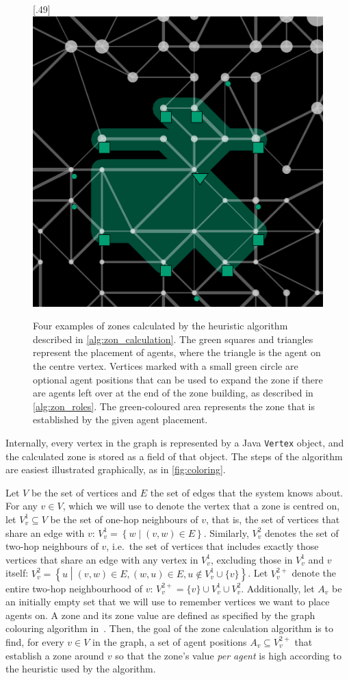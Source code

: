 \begin{figure}
  [.49\linewidth]{\includegraphics[width=.49\linewidth]{images/zone4.png}}
           \caption{Four examples of zones calculated by the heuristic algorithm described in \autoref{alg:zon_calculation}.
           The green squares and triangles represent the placement of agents, where the triangle is the agent on the centre vertex.
           Vertices marked with a small green circle are optional agent positions that can be used to expand the zone if there are agents left over at the end of the zone building, as described in \autoref{alg:zon_roles}.
           The green-coloured area represents the zone that is established by the given agent placement.}
  \label{fig:zones}
\end{figure}
Internally, every vertex in the graph is represented by a Java \lstinline{Vertex} object, and the calculated zone is stored as a field of that object.
The steps of the algorithm are easiest illustrated graphically, as in \autoref{fig:coloring}.
\begin{definition}
  Let $V$ be the set of vertices and $E$ the set of edges that the system knows about.
  For any $v \in V$, which we will use to denote the vertex that a zone is centred on, let $V_v^1 \subseteq V$ be the set of one-hop neighbours of $v$, that is, the set of vertices that share an edge with $v$: $V_v^1= \left\{w \middle|\left(v,w \right ) \in E\right\}$.
  Similarly, $V_v^2$ denotes the set of two-hop neighbours of $v$, i.e.\ the set of vertices that includes exactly those vertices that share an edge with any vertex in $V_v^1$, excluding those in $V_v^1$ and $v$ itself: $V_v^2= \left\{u \middle|\left(v,w \right ) \in E, \left(w,u \right ) \in E, u \notin V_v^1\cup\{v\}\right\}$.
  Let $V_v^{2+}$ denote the entire two-hop neighbourhood of $v$: $V_{v}^{2+} = \{v\} \cup V_v^1 \cup V_v^2$.
  Additionally, let $A_v$ be an initially empty set that we will use to remember vertices we want to place agents on.
  A zone and its zone value are defined as specified by the graph colouring algorithm in~\cite{ahlbrecht_mapc_2014}.
  Then, the goal of the zone calculation algorithm is to find, for every $v \in V$ in the graph, a set of agent positions $A_v \subseteq V_{v}^{2+}$ that establish a zone around $v$ so that the zone's value \emph{per agent} is high according to the heuristic used by the algorithm.
\end{definition}

